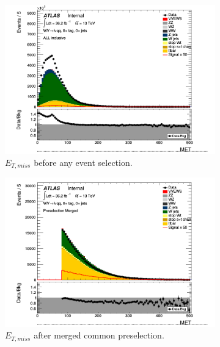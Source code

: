 \begin{figure}[ht]
\centering
        \begin{subfigure}{0.3\textwidth}
            \includegraphics[width=\linewidth]{figures/1lep/CRPlots/C_0ptag0pjet_0ptv_ALL_MET_Lin.png}
            \caption{$E_{T,miss}$ before any event selection.}
        \end{subfigure}
        \begin{subfigure}{0.3\textwidth}
            \includegraphics[width=\linewidth]{figures/1lep/CRPlots/C_0ptag0pjet_0ptv_Presel_Merged_MET_Lin.png}
            \caption{$E_{T,miss}$ after merged common preselection.}
        \end{subfigure}
        \begin{subfigure}{0.3\textwidth}

\end{subfigure}
\end{figure}
